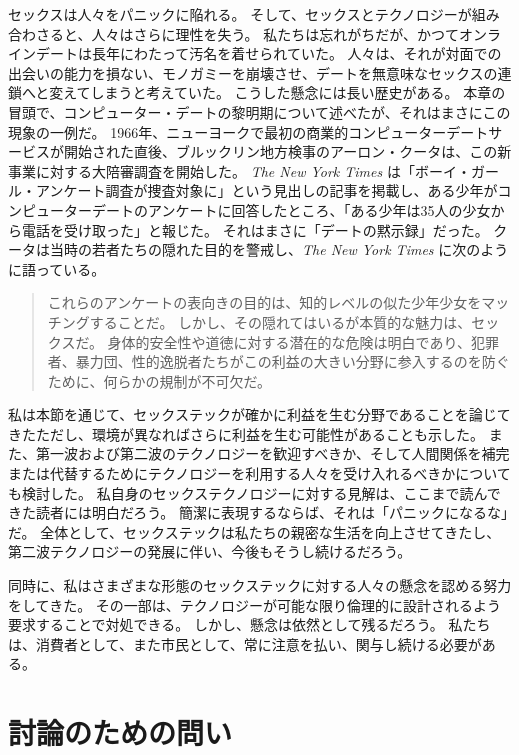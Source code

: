 \documentclass[paper=a4,book,openany]{jlreq} \usepackage{mystyle}
\begin{document}
セックスは人々をパニックに陥れる。
そして、セックスとテクノロジーが組み合わさると、人々はさらに理性を失う。
私たちは忘れがちだが、かつてオンラインデートは長年にわたって汚名を着せられていた。
人々は、それが対面での出会いの能力を損ない、モノガミーを崩壊させ、デートを無意味なセックスの連鎖へと変えてしまうと考えていた。
こうした懸念には長い歴史がある。
本章の冒頭で、コンピューター・デートの黎明期について述べたが、それはまさにこの現象の一例だ。
1966年、ニューヨークで最初の商業的コンピューターデートサービスが開始された直後、ブルックリン地方検事のアーロン・クータは、この新事業に対する大陪審調査を開始した。
\emph{The New York Times} は「ボーイ・ガール・アンケート調査が捜査対象に」という見出しの記事を掲載し、ある少年がコンピューターデートのアンケートに回答したところ、「ある少年は35人の少女から電話を受け取った」と報じた。
それはまさに「デートの黙示録」だった。
クータは当時の若者たちの隠れた目的を警戒し、\emph{The New York Times} に次のように語っている。

\begin{quote}
  これらのアンケートの表向きの目的は、知的レベルの似た少年少女をマッチングすることだ。
しかし、その隠れてはいるが本質的な魅力は、セックスだ。
身体的安全性や道徳に対する潜在的な危険は明白であり、犯罪者、暴力団、性的逸脱者たちがこの利益の大きい分野に参入するのを防ぐために、何らかの規制が不可欠だ。
\citep{anderson66:_boy_girl_quest_inves}
\end{quote}

私は本節を通じて、セックステックが確かに利益を生む分野であることを論じてきた{\DDASH}ただし、環境が異なればさらに利益を生む可能性があることも示した。
また、第一波および第二波のテクノロジーを歓迎すべきか、そして人間関係を補完または代替するためにテクノロジーを利用する人々を受け入れるべきかについても検討した。
私自身のセックステクノロジーに対する見解は、ここまで読んできた読者には明白だろう。
簡潔に表現するならば、それは「パニックになるな」だ。
全体として、セックステックは私たちの親密な生活を向上させてきたし、第二波テクノロジーの発展に伴い、今後もそうし続けるだろう。

同時に、私はさまざまな形態のセックステックに対する人々の懸念を認める努力をしてきた。
その一部は、テクノロジーが可能な限り倫理的に設計されるよう要求することで対処できる。
しかし、懸念は依然として残るだろう。
私たちは、消費者として、また市民として、常に注意を払い、関与し続ける必要がある。

\section{討論のための問い}
\end{document}
